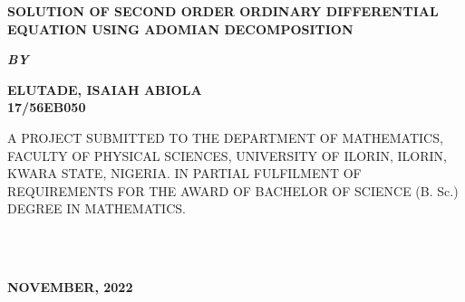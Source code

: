 \documentclass[11pt]{report}
\newcommand{\bt}[1]{\textbf{#1}}
\begin{document}
	
	\clearpage
	\thispagestyle{empty}
	\begin{center}
		\Large \bt{SOLUTION OF SECOND ORDER ORDINARY DIFFERENTIAL EQUATION USING ADOMIAN DECOMPOSITION}
	\end{center}

	\hspace{7cm}
	
	\begin{center}
		\textbf{\textit{BY}}
	\end{center}
	
	\hspace{5cm}
	
	\begin{center}
		\large \textbf{ELUTADE, ISAIAH ABIOLA
			\\
			17/56EB050}
	\end{center}
	
	\hspace{9cm}
	
	\begin{center}
		A PROJECT SUBMITTED TO THE DEPARTMENT OF MATHEMATICS, FACULTY OF PHYSICAL SCIENCES, UNIVERSITY OF ILORIN, ILORIN, KWARA STATE, NIGERIA. IN PARTIAL FULFILMENT OF REQUIREMENTS FOR THE AWARD OF BACHELOR OF SCIENCE (B. Sc.) DEGREE IN MATHEMATICS.
	\end{center}

	\hspace{7cm}
	
%	
~~~~~~
	\\ \\ 
	\begin{center}
		\textbf{NOVEMBER, 2022}
	\end{center}

	\newpage
\end{document}
